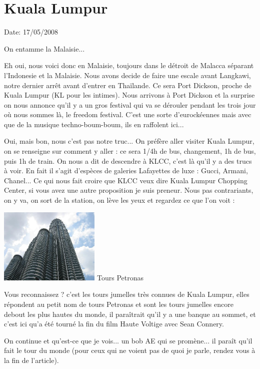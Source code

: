 \section{Kuala Lumpur}

Date: 17/05/2008

\begin{multicols}{2}

On entamme la Malaisie...

Eh oui, nous voici donc en Malaisie, toujours dans le détroit de Malacca séparant l'Indonesie et la Malaisie. Nous avons decide de faire une escale avant Langkawi, notre dernier arrêt avant d'entrer en Thaïlande. Ce sera Port Dickson, proche de Kuala Lumpur (KL pour les intimes). Nous arrivons à Port Dickson et la surprise on nous annonce qu'il y a un gros festival qui va se dérouler pendant les trois jour où nous sommes là, le freedom festival. C'est une sorte d'eurockéennes mais avec que de la musique techno-boum-boum, ils en raffolent ici...

Oui, mais bon, nous c'est pas notre truc... On préfère aller visiter Kuala Lumpur, on se renseigne sur comment y aller : ce sera 1/4h de bus, changement, 1h de bus, puis 1h de train. On nous a dit de descendre à KLCC, c'est là qu'il y a des trucs à voir. En fait il s'agit d'espèces de galeries Lafayettes de luxe : Gucci, Armani, Chanel... Ce qui nous fait croire que KLCC veux dire Kuala Lumpur Chopping Center, si vous avez une autre proposition je suis preneur. Nous pas contrariants, on y va, on sort de la station, on lève les yeux et regardez ce que l'on voit :

\hspace*{-0.65cm}
\includegraphics[width=4.8cm]{articles/Kuala-lumpur/1210432312E0e6.jpg}
Tours Petronas

Vous reconnaissez ? c'est les tours jumelles très connues de Kuala Lumpur, elles répondent au petit nom de tours Petronas et sont les tours jumelles encore debout les plus hautes du monde, il paraîtrait qu'il y a une banque au sommet, et c'est ici qu'a été tourné la fin du film Haute Voltige avec Sean Connery.

On continue et qu'est-ce que je vois... un bob AE qui se promène... il paraît qu'il fait le tour du monde (pour ceux qui ne voient pas de quoi je parle, rendez vous à la fin de l'article).


\end{multicols}
